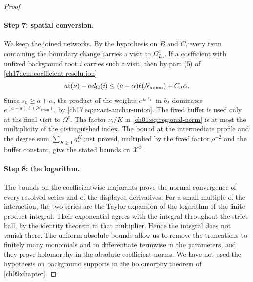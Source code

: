 \begin{proof}
\paragraph{Step 7: spatial conversion.}
We keep the joined networks. By the hypothesis on $B$ and $C$, every term containing the boundary change carries a visit to $\Omega^c_{L_J}$. If a coefficient with unfixed background root $i$ carries such a visit, then by part (5) of \cref{ch17:lem:coefficient-resolution}
\[
 a\mathsf t(\nu)+\alpha d_\Omega(i)\le(a+\alpha)\ell(\mathcal N_{\mathrm{union}})+C_J\alpha.
\]
Since $s_0\ge a+\alpha$, the product of the weights $e^{s_0\ell_\lambda}$ in $b_\lambda$ dominates $e^{(a+\alpha)\ell(\mathcal N_{\mathrm{union}})}$, by \eqref{ch17:eq:exact-anchor-union}. The fixed buffer is used only at the final visit to $\Omega^c$. The factor $\nu_i/K$ in \eqref{ch01:eq:regional-norm} is at most the multiplicity of the distinguished index. The bound at the intermediate profile and the degree sum $\sum_{K\ge1}q_*^K$ just proved, multiplied by the fixed factor $\rho^{-2}$ and the buffer constant, give the stated bounds on $\mathcal X^\phi$.

\paragraph{Step 8: the logarithm.}
The bounds on the coefficientwise majorants prove the normal convergence of every resolved series and of the displayed derivatives. For a small multiple of the interaction, the two series are the Taylor expansion of the logarithm of the finite product integral. Their exponential agrees with the integral throughout the strict ball, by the identity theorem in that multiplier. Hence the integral does not vanish there. The uniform absolute bounds allow us to remove the truncations to finitely many monomials and to differentiate termwise in the parameters, and they prove holomorphy in the absolute coefficient norms. We have not used the hypothesis on background supports in the holomorphy theorem of \cref{ch09:chapter}.
\end{proof}

